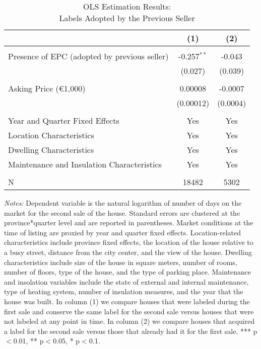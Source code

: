 \documentclass[12pt]{article}
\begin{document}
\clearpage
\newpage
\begin{table}[H]
\footnotesize
  \centering
  \caption{OLS Estimation Results:\\ Labels Adopted by the Previous Seller}
      \begin{tabular}{lcc}
\hline
                &\multicolumn{1}{c}{(1)}&\multicolumn{1}{c}{(2)}\\
                
\hline
&&\\
Presence of EPC (adopted by previous seller)& 	-0.257$^{**}$ & -0.043 \\
& (0.027) & (0.039) \\
&&\\
Asking Price (\euro 1,000) & 0.00008 & 	-0.0007  \\
& (0.00012) &  (0.0004) \\
&&\\
Year and Quarter Fixed Effects  & Yes & Yes \\
Location Characteristics & Yes & Yes \\
Dwelling Characteristics  & Yes & Yes \\
Maintenance and Insulation Characteristics & Yes & Yes \\
&&\\
N &	18482 &	5302 \\
\hline

    \end{tabular}%
\begin{tablenotes}
\scriptsize
\item \textit{Notes:} Dependent variable is the natural logarithm of number of days on the market for the second sale of the house. Standard errors are clustered at the province*quarter level and are reported in parentheses. Market conditions at the time of listing are proxied by year and quarter fixed effects. Location-related characteristics include province fixed effects, the location of the house relative to a busy street, distance from the city center, and the view of the house. Dwelling characteristics include size of the house in square meters, number of rooms, number of floors, type of the house, and the type of parking place. Maintenance and insolation variables include the state of external and internal maintenance, type of heating system, number of insulation measures, and the year that the house was built. In column (1) we compare houses that were labeled during the first sale and conserve the same label for the second sale versus houses that were not labeled at any point in time. In column (2) we compare houses that acquired a label for the second sale versus those that already had it for the first sale. *** p$<$0.01, ** p$<$0.05, * p$<$0.1. 
\end{tablenotes}

  \label{tab:addlabel}%
\end{table}%
\end{document}
